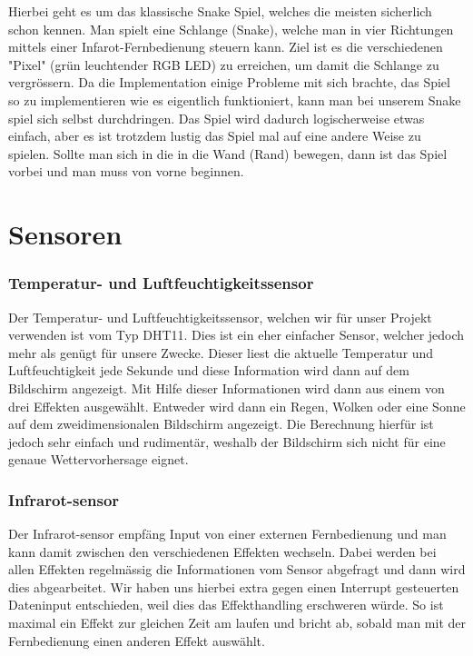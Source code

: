 \documentclass[12pt,a4paper]{article}
\begin{document}
Hierbei geht es um das klassische Snake Spiel, welches die meisten sicherlich schon kennen.
Man spielt eine Schlange (Snake), welche man in vier Richtungen mittels einer Infarot-Fernbedienung steuern kann.
Ziel ist es die verschiedenen "Pixel" (grün leuchtender RGB LED) zu erreichen, um damit die Schlange zu vergrössern.
Da die Implementation einige Probleme mit sich brachte, das Spiel so zu implementieren wie es eigentlich funktioniert, kann
man bei unserem Snake spiel sich selbst durchdringen. Das Spiel wird dadurch logischerweise etwas einfach, aber es ist trotzdem lustig
das Spiel mal auf eine andere Weise zu spielen.
Sollte man sich in die in die Wand (Rand) bewegen, dann ist das Spiel vorbei und man muss von vorne beginnen.

\section{Sensoren}

\subsubsection{Temperatur- und Luftfeuchtigkeitssensor}

Der Temperatur- und Luftfeuchtigkeitssensor, welchen wir für unser Projekt verwenden ist vom Typ DHT11. Dies ist ein eher einfacher Sensor, welcher jedoch mehr als genügt für unsere Zwecke. Dieser liest die aktuelle Temperatur und Luftfeuchtigkeit jede Sekunde und diese Information wird dann auf dem Bildschirm angezeigt. Mit Hilfe dieser Informationen wird dann aus einem von drei Effekten ausgewählt. Entweder wird dann ein Regen, Wolken oder eine Sonne auf dem zweidimensionalen Bildschirm angezeigt. Die Berechnung hierfür ist jedoch sehr einfach und rudimentär, weshalb der Bildschirm sich nicht für eine genaue Wettervorhersage eignet. 

\subsubsection{Infrarot-sensor}

Der Infrarot-sensor empfäng Input von einer externen Fernbedienung und man kann damit zwischen den verschiedenen Effekten wechseln. Dabei werden bei allen Effekten regelmässig die Informationen vom Sensor abgefragt und dann wird dies abgearbeitet. Wir haben uns hierbei extra gegen einen Interrupt gesteuerten Dateninput entschieden, weil dies das Effekthandling erschweren würde. So ist maximal ein Effekt zur gleichen Zeit am laufen und bricht ab, sobald man mit der Fernbedienung einen anderen Effekt auswählt.
\end{document}
